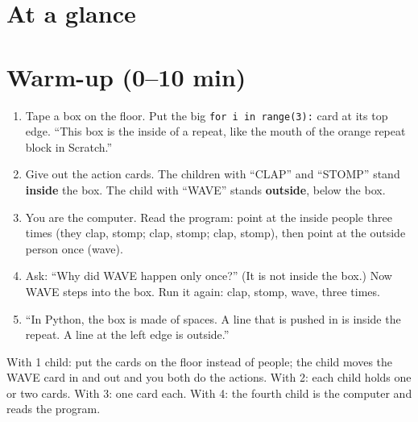 \section{At a glance}
\begin{timeplan}
\end{timeplan}

\section{Warm-up (0--10 min)}
\begin{unplugged}
\begin{enumerate}[leftmargin=1.4em,itemsep=1pt]
  \item Tape a box on the floor. Put the big \texttt{for i in range(3):} card at its top edge. \enquote{This box is the inside of a repeat, like the mouth of the orange repeat block in Scratch.}
  \item Give out the action cards. The children with \enquote{CLAP} and \enquote{STOMP} stand \textbf{inside} the box. The child with \enquote{WAVE} stands \textbf{outside}, below the box.
  \item You are the computer. Read the program: point at the inside people three times (they clap, stomp; clap, stomp; clap, stomp), then point at the outside person once (wave).
  \item Ask: \enquote{Why did WAVE happen only once?} (It is not inside the box.) Now WAVE steps into the box. Run it again: clap, stomp, wave, three times.
  \item \enquote{In Python, the box is made of spaces. A line that is pushed in is inside the repeat. A line at the left edge is outside.}
\end{enumerate}
With 1 child: put the cards on the floor instead of people; the child moves the WAVE card in and out and you both do the actions. With 2: each child holds one or two cards. With 3: one card each. With 4: the fourth child is the computer and reads the program.
\end{unplugged}

